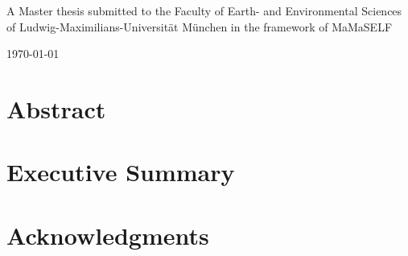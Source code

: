 \documentclass[12pt, oneside]{book}
\begin{document}
\begin{titlepage}
\begin{center}
\vfill

A Master thesis submitted to the Faculty
of Earth- and Environmental Sciences\\
of Ludwig-Maximilians-Universität München
in the framework of MaMaSELF

\vspace*{3cm}

\today %
\end{center}
\end{titlepage}

\frontmatter 



\chapter{Abstract}

\chapter{Executive Summary}


\chapter{Acknowledgments}


\tableofcontents
\end{document}

